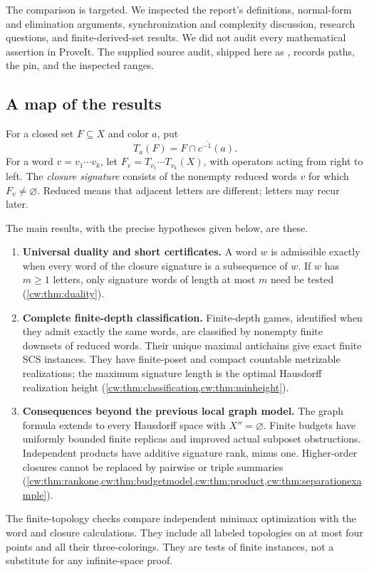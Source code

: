 \documentclass[11pt,letterpaper]{article}
\numberwithin{equation}{section}
\theoremstyle{definition}
\theoremstyle{remark}
\theoremstyle{definition}
\newcommand{\cwcl}[1]{\overline{#1}}
\begin{document}
The comparison is targeted. We inspected the report's definitions, normal-form
and elimination arguments, synchronization and complexity discussion,
research questions, and finite-derived-set results. We did not audit every
mathematical assertion in ProveIt. The supplied source audit, shipped here as
, records
paths, the pin, and the inspected ranges.

\subsection{A map of the results}

For a closed set $F\subseteq X$ and color $a$, put
\[
 T_a(F)=\cwcl{F\cap c^{-1}(a)}.
\]
For a word $v=v_1\cdots v_k$, let
$F_v=T_{v_1}\cdots T_{v_k}(X)$, with operators acting from right to left.
The \emph{closure signature} consists of the nonempty reduced words $v$ for
which $F_v\ne\varnothing$. Reduced means that adjacent letters are different;
letters may recur later.

The main results, with the precise hypotheses given below, are these.
\begin{enumerate}
\item \textbf{Universal duality and short certificates.}
A word $w$ is admissible exactly when every word of the closure signature is
a subsequence of $w$. If $w$ has $m\ge1$ letters, only signature words of
length at most $m$ need be tested (\cref{cw:thm:duality}).
\item \textbf{Complete finite-depth classification.}
Finite-depth games, identified when they admit exactly the same words, are
classified by nonempty finite downsets of reduced words. Their unique maximal
antichains give exact finite SCS instances. They have finite-poset and compact
countable metrizable realizations; the maximum signature length is the
optimal Hausdorff realization height (\cref{cw:thm:classification,cw:thm:minheight}).
\item \textbf{Consequences beyond the previous local graph model.}
The graph formula extends to every Hausdorff space with $X''=\varnothing$.
Finite budgets have uniformly bounded finite replicas and improved actual
subposet obstructions. Independent products have additive signature rank,
minus one. Higher-order closures cannot be replaced by pairwise or triple
summaries (\cref{cw:thm:rankone,cw:thm:budgetmodel,cw:thm:product,cw:thm:separationexample}).
\end{enumerate}

The finite-topology checks compare independent minimax optimization with the
word and closure calculations. They include all labeled topologies on at most
four points and all their three-colorings. They are tests of finite instances,
not a substitute for any infinite-space proof.
\end{document}
